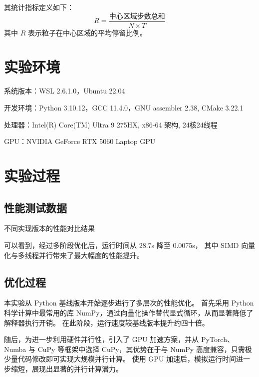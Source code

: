 \documentclass[a4paper,12pt]{article}
\begin{document}
\begin{CJK}{UTF8}{gbsn}
	其统计指标定义如下：
	\[
		R = \dfrac{\text{中心区域步数总和}}{N \times T}
	\]
	其中 $R$ 表示粒子在中心区域的平均停留比例。

	\section{实验环境}
	系统版本：WSL 2.6.1.0，Ubuntu 22.04

	开发环境：Python 3.10.12，GCC 11.4.0，GNU assembler 2.38, CMake 3.22.1

	处理器：Intel(R) Core(TM) Ultra 9 275HX, x86-64 架构, 24核24线程

	GPU：NVIDIA GeForce RTX 5060 Laptop GPU

	\section{实验过程}
	\subsection{性能测试数据}
	\begin{table}[H]
		\centering
		\datatable
		\pgfplotstabletypeset[
			string type,
			columns={0,1,2,3,4}, %
			columns/0/.style={column name=实现版本},
			columns/1/.style={column name=重复次数},
			columns/2/.style={column name=平均停留比例},
			columns/3/.style={column name=平均模拟时间 (s)},
			columns/4/.style={column name=加速倍数},
			every head row/.style={before row=\toprule, after row=\midrule},
			every last row/.style={after row=\bottomrule}
		]{\datatable}
		\caption{不同实现版本的性能对比结果}
	\end{table}


	可以看到，经过多阶段优化后，运行时间从 28.7s 降至 0.0075s，
	其中 SIMD 向量化与多线程并行带来了最大幅度的性能提升。

	\subsection{优化过程}
	本实验从 Python 基线版本开始逐步进行了多层次的性能优化。
	首先采用 Python 科学计算中最常用的库 NumPy，通过向量化操作替代显式循环，从而显著降低了解释器执行开销。
	在此阶段，运行速度较基线版本提升约四十倍。

	随后，为进一步利用硬件并行性，引入了 GPU 加速方案，并从 PyTorch、Numba 与 CuPy 等框架中选择 CuPy，其优势在于与 NumPy 高度兼容，只需极少量代码修改即可实现大规模并行计算。
	使用 GPU 加速后，模拟运行时间进一步缩短，展现出显著的并行计算潜力。


\end{CJK}
\end{document}
